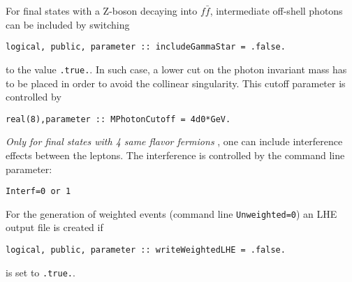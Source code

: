 \documentclass[aps,superscriptaddress,nofootinbib]{revtex4}
\begin{document}
\noindent
For final states with a Z-boson decaying into $f\bar f$, intermediate off-shell photons can be included by switching 
\begin{verbatim}
logical, public, parameter :: includeGammaStar = .false. 
\end{verbatim}
to the value \verb|.true.|. In such case, a lower cut on the photon invariant mass has to be placed in order to avoid the
collinear singularity. This cutoff parameter is controlled by
\begin{verbatim}
real(8),parameter :: MPhotonCutoff = 4d0*GeV.
\end{verbatim}


\noindent
{\it Only for final states with 4 same flavor fermions }, one can include interference effects between the leptons.  The interference is controlled by the command line parameter:
\begin{verbatim}
Interf=0 or 1
\end{verbatim}

\noindent
For the generation of weighted events (command line \verb|Unweighted=0|) an LHE output file is created if
\begin{verbatim}
logical, public, parameter :: writeWeightedLHE = .false. 
\end{verbatim}
is set to \verb|.true.|.
\end{document}
